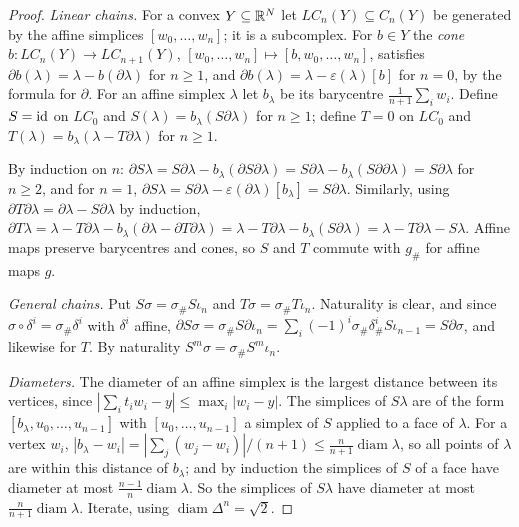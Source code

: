 \begin{proof}
\emph{Linear chains.} For a convex $Y \subseteq \mathbb{R}^N$ let $LC_n(Y) \subseteq C_n(Y)$ be generated by the affine simplices $[w_0, \ldots, w_n]$; it is a subcomplex. For
$b \in Y$ the \emph{cone} $b \colon LC_n(Y) \to LC_{n+1}(Y)$, $[w_0, \ldots, w_n] \mapsto [b, w_0, \ldots, w_n]$, satisfies $\partial b(\lambda) = \lambda - b(\partial\lambda)$
for $n \geq 1$, and $\partial b(\lambda) = \lambda - \varepsilon(\lambda)[b]$ for $n = 0$, by the formula for $\partial$. For an affine simplex $\lambda$ let $b_\lambda$ be
its barycentre $\frac{1}{n+1}\sum_i w_i$. Define $S = \mathrm{id}$ on $LC_0$ and $S(\lambda) = b_\lambda(S\partial\lambda)$ for $n \geq 1$; define $T = 0$ on $LC_0$ and
$T(\lambda) = b_\lambda(\lambda - T\partial\lambda)$ for $n \geq 1$.

By induction on $n$: $\partial S\lambda = S\partial\lambda - b_\lambda(\partial S\partial\lambda) = S\partial\lambda - b_\lambda(S\partial\partial\lambda) = S\partial\lambda$ for $n \geq 2$,
and for $n = 1$, $\partial S\lambda = S\partial\lambda - \varepsilon(\partial\lambda)[b_\lambda] = S\partial\lambda$. Similarly, using $\partial T\partial\lambda = \partial\lambda - S\partial\lambda$ by
induction, $\partial T\lambda = \lambda - T\partial\lambda - b_\lambda(\partial\lambda - \partial T\partial\lambda) = \lambda - T\partial\lambda - b_\lambda(S\partial\lambda) = \lambda - T\partial\lambda - S\lambda$.
Affine maps preserve barycentres and cones, so $S$ and $T$ commute with $g_\#$ for affine maps $g$.

\emph{General chains.} Put $S\sigma = \sigma_\#S\iota_n$ and $T\sigma = \sigma_\#T\iota_n$. Naturality is clear, and since $\sigma \circ \delta^i = \sigma_\#\delta^i$ with $\delta^i$ affine,
$\partial S\sigma = \sigma_\#S\partial\iota_n = \sum_i(-1)^i\sigma_\#\delta^i_\#S\iota_{n-1} = S\partial\sigma$, and likewise for $T$. By naturality
$S^m\sigma = \sigma_\#S^m\iota_n$.

\emph{Diameters.} The diameter of an affine simplex is the largest distance between its vertices, since $|\sum_i t_iw_i - y| \leq \max_i|w_i - y|$. The simplices of
$S\lambda$ are of the form $[b_\lambda, u_0, \ldots, u_{n-1}]$ with $[u_0, \ldots, u_{n-1}]$ a simplex of $S$ applied to a face of $\lambda$. For a vertex $w_i$,
$|b_\lambda - w_i| = |\sum_j (w_j - w_i)|/(n+1) \leq \frac{n}{n+1}\operatorname{diam}\lambda$, so all points of $\lambda$ are within this distance of $b_\lambda$;
and by induction the simplices of $S$ of a face have diameter at most $\frac{n-1}{n}\operatorname{diam}\lambda$. So the simplices of $S\lambda$ have diameter at most
$\frac{n}{n+1}\operatorname{diam}\lambda$. Iterate, using $\operatorname{diam}\Delta^n = \sqrt{2}$.
\end{proof}

